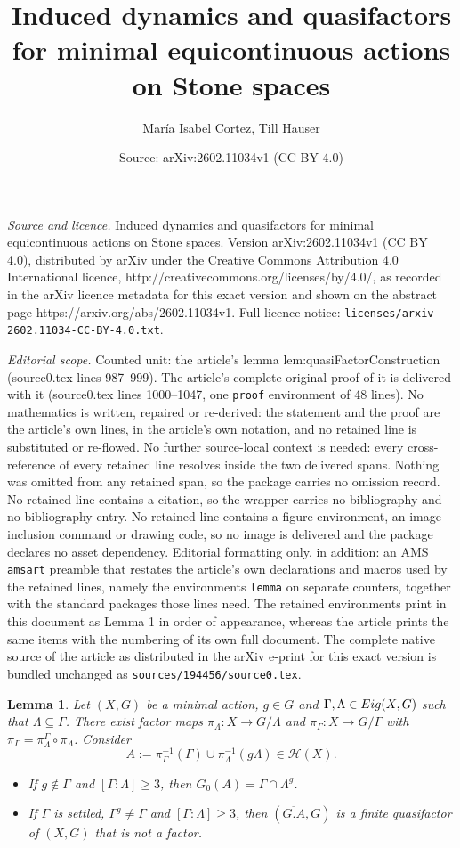 \documentclass[10pt,a4paper]{amsart}
\title{Induced dynamics and quasifactors for minimal equicontinuous actions on Stone spaces}
\author{Mar\'ia Isabel Cortez, Till Hauser}
\date{Source: arXiv:2602.11034v1 (CC BY 4.0)}
\newtheorem{lemma}{Lemma}
\def\Eig{{\rm Eig}}
\def\hyper{{\mathcal{H}}}
\begin{document}
\maketitle

\noindent\emph{Source and licence.} Induced dynamics and quasifactors for minimal equicontinuous actions on Stone spaces. Version arXiv:2602.11034v1 (CC BY 4.0), distributed by arXiv under the Creative Commons Attribution 4.0 International licence, http://creativecommons.org/licenses/by/4.0/, as recorded in the arXiv licence metadata for this exact version and shown on the abstract page https://arxiv.org/abs/2602.11034v1. Full licence notice: \texttt{licenses/arxiv-2602.11034-CC-BY-4.0.txt}.\par\smallskip

\noindent\textit{Editorial scope.} Counted unit: the article's lemma lem:quasiFactorConstruction (source0.tex lines 987--999). The article's complete original proof of it is delivered with it (source0.tex lines 1000--1047, one \texttt{proof} environment of 48 lines). No mathematics is written, repaired or re-derived: the statement and the proof are the article's own lines, in the article's own notation, and no retained line is substituted or re-flowed.  No further source-local context is needed: every cross-reference of every retained line resolves inside the two delivered spans.  Nothing was omitted from any retained span, so the package carries no omission record.  No retained line contains a citation, so the wrapper carries no bibliography and no bibliography entry.  No retained line contains a figure environment, an image-inclusion command or drawing code, so no image is delivered and the package declares no asset dependency.  Editorial formatting only, in addition: an AMS \texttt{amsart} preamble that restates the article's own declarations and macros used by the retained lines, namely the environments \texttt{lemma} on separate counters, together with the standard packages those lines need.  The retained environments print in this document as Lemma 1 in order of appearance, whereas the article prints the same items with the numbering of its own full document.  The complete native source of the article as distributed in the arXiv e-print for this exact version is bundled unchanged as \texttt{sources/194456/source0.tex}.
\begin{lemma}
\label{lem:quasiFactorConstruction}
    Let $(X,G)$ be a minimal action, $g\in G$ and $\Gamma,\Lambda\in \Eig(X,G)$ such that $\Lambda\subseteq \Gamma$. 
    There exist factor maps $\pi_\Lambda\colon X\to G/\Lambda$ and 
    $\pi_\Gamma\colon X\to G/\Gamma$ with $\pi_\Gamma=\pi^\Gamma_\Lambda\circ \pi_\Lambda$. 
    Consider 
    \[A := \pi_\Gamma^{-1}(\Gamma)\cup \pi_\Lambda^{-1}(g\Lambda)\in \hyper(X).\]
\begin{itemize}
    \item[(i)] If $g\notin \Gamma$ and $[\Gamma\colon \Lambda]\geq 3$, then $G_0(A)=\Gamma\cap \Lambda^g$. 
    \item[(ii)] If $\Gamma$ is settled, $\Gamma^g\neq \Gamma$ and $[\Gamma\colon \Lambda]\geq 3$, then 
    $(\overline{G.A},G)$ is a finite quasifactor of $(X,G)$ that is not a factor.
\end{itemize}
\end{lemma}
\end{document}
